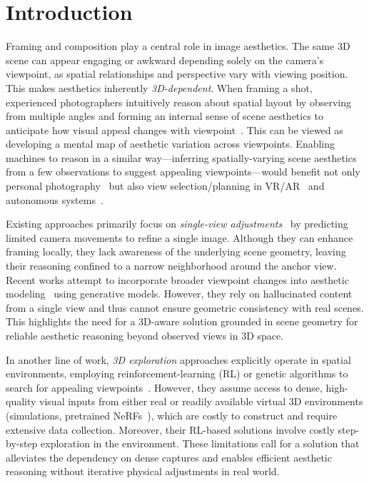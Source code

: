 \section{Introduction}
\label{sec:intro}

Framing and composition play a central role in image aesthetics.
The same 3D scene can appear engaging or awkward depending solely on the camera’s viewpoint, as spatial relationships and perspective vary with viewing position. This makes aesthetics inherently \textit{3D-dependent}.  
When framing a shot, experienced photographers intuitively reason about spatial layout by observing from multiple angles and forming an internal sense of scene aesthetics to anticipate how visual appeal changes with viewpoint~\cite{freeman2017photographer}. This can be viewed as developing a mental map of aesthetic variation across viewpoints.
Enabling machines to reason in a similar way—inferring spatially-varying scene aesthetics from a few observations to suggest appealing viewpoints—would benefit not only personal photography~\cite{su2021camera,li2025towards} but also view selection/planning in VR/AR~\cite{wang2025cinefolio,zaman2023vicarious} and autonomous systems~\cite{xie2023gait,alzayer2021autophoto}.


Existing approaches primarily focus on \textit{single-view adjustments}~\cite{li2025towards,su2021camera,liu2023beyond} by predicting limited camera movements to refine a single image. Although they can enhance framing locally, they lack awareness of the underlying scene geometry, leaving their reasoning confined to a narrow neighborhood around the anchor view.
Recent works attempt to incorporate broader viewpoint changes into aesthetic modeling~\cite{yao2025photography,uchida20253d} using generative models. However, they rely on hallucinated content from a single view and thus cannot ensure geometric consistency with real scenes. This highlights the need for a 3D-aware solution grounded in scene geometry for reliable aesthetic reasoning beyond observed views in 3D space.

In another line of work, \textit{3D exploration} approaches explicitly operate in spatial environments, employing reinforcement-learning (RL) or genetic algorithms to search for appealing  viewpoints~\cite{alzayer2021autophoto,xie2023gait,wu2024viewactive,skartados2024finding}. However, they assume access to dense, high-quality visual inputs from either real or readily available virtual 3D environments (\eg simulations, pretrained NeRFs~\cite{mildenhall2021nerf}), which are costly to construct and require extensive data collection. Moreover, their RL-based solutions involve costly step-by-step exploration in the environment. These limitations call for a solution that alleviates the dependency on dense captures and enables efficient aesthetic reasoning without iterative physical adjustments in real world.

